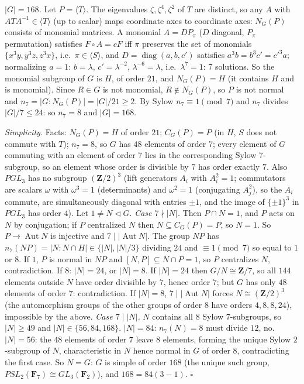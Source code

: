 \documentclass[11pt]{article}
\begin{document}
\emph{$|G|=168$.} Let $P=\langle T\rangle$. The eigenvalues $\zeta,\zeta^4,\zeta^2$ of $T$ are distinct, so any $A$ with $ATA^{-1}\in\langle T\rangle$ (up to scalar) maps coordinate axes to coordinate axes: $N_G(P)$ consists of monomial matrices. A monomial $A=DP_\pi$ ($D$ diagonal, $P_\pi$ permutation) satisfies $F\circ A=cF$ iff $\pi$ preserves the set of monomials $\{x^3y,y^3z,z^3x\}$, i.e.\ $\pi\in\langle S\rangle$, and $D=\operatorname{diag}(a,b,c')$ satisfies $a^3b=b^3c'=c'^3a$; normalizing $a=1$: $b=\lambda$, $c'=\lambda^{-2}$, $\lambda^{-6}=\lambda$, i.e.\ $\lambda^7=1$: 7 solutions. So the monomial subgroup of $G$ is $H$, of order $21$, and $N_G(P)=H$ (it contains $H$ and is monomial). Since $R\in G$ is not monomial, $R\notin N_G(P)$, so $P$ is not normal and $n_7=|G:N_G(P)|=|G|/21\ge2$. By Sylow $n_7\equiv1\pmod7$ and $n_7$ divides $|G|/7\le24$: so $n_7=8$ and $|G|=168$.

\emph{Simplicity.} Facts: $N_G(P)=H$ of order $21$; $C_G(P)=P$ (in $H$, $S$ does not commute with $T$); $n_7=8$, so $G$ has $48$ elements of order $7$; every element of $G$ commuting with an element of order $7$ lies in the corresponding Sylow $7$-subgroup, so an element whose order is divisible by $7$ has order exactly $7$. Also $PGL_3$ has no subgroup $(\mathbf Z/2)^3$ (lift generators $A_i$ with $A_i^2=1$; commutators are scalars $\omega$ with $\omega^3=1$ (determinants) and $\omega^2=1$ (conjugating $A_j^2$), so the $A_i$ commute, are simultaneously diagonal with entries $\pm1$, and the image of $\{\pm1\}^3$ in $PGL_3$ has order $4$). Let $1\ne N\lhd G$. \emph{Case $7\nmid|N|$.} Then $P\cap N=1$, and $P$ acts on $N$ by conjugation; if $P$ centralized $N$ then $N\subseteq C_G(P)=P$, so $N=1$. So $P\to\operatorname{Aut}N$ is injective and $7\mid|\operatorname{Aut}N|$. The group $NP$ has $n_7(NP)=|N:N\cap H|\in\{|N|,|N|/3\}$ dividing $24$ and $\equiv1\pmod 7$ so equal to $1$ or $8$. If $1$, $P$ is normal in $NP$ and $[N,P]\subseteq N\cap P=1$, so $P$ centralizes $N$, contradiction. If $8$: $|N|=24$, or $|N|=8$. If $|N|=24$ then $G/N\cong\mathbf Z/7$, so all $144$ elements outside $N$ have order divisible by $7$, hence order $7$; but $G$ has only $48$ elements of order $7$: contradiction. If $|N|=8$, $7\mid|\operatorname{Aut}N|$ forces $N\cong(\mathbf Z/2)^3$ (the automorphism groups of the other groups of order $8$ have orders $4,8,8,24$), impossible by the above. \emph{Case $7\mid|N|$.} $N$ contains all $8$ Sylow $7$-subgroups, so $|N|\ge49$ and $|N|\in\{56,84,168\}$. $|N|=84$: $n_7(N)=8$ must divide $12$, no. $|N|=56$: the $48$ elements of order $7$ leave $8$ elements, forming the unique Sylow $2$-subgroup of $N$, characteristic in $N$ hence normal in $G$ of order $8$, contradicting the first case. So $N=G$: $G$ is simple of order $168$ (the unique such group, $PSL_2(\mathbf F_7)\cong GL_3(\mathbf F_2)$), and $168=84(3-1)$. \hfill$\square$
\end{document}
